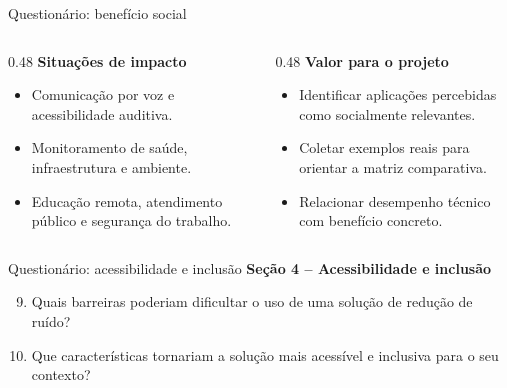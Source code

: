 \documentclass[aspectratio=1610,11pt]{beamer}
\begin{document}
{\begin{frame}[noframenumbering]{Questionário: benefício social}
    \vspace{0.2cm}
    \begin{columns}[T,onlytextwidth]
        \begin{column}{0.48\textwidth}
            \textbf{Situações de impacto}
            \begin{itemize}
                \item Comunicação por voz e acessibilidade auditiva.
                \item Monitoramento de saúde, infraestrutura e ambiente.
                \item Educação remota, atendimento público e segurança do trabalho.
            \end{itemize}
        \end{column}
        \begin{column}{0.48\textwidth}
            \textbf{Valor para o projeto}
            \begin{itemize}
                \item Identificar aplicações percebidas como socialmente relevantes.
                \item Coletar exemplos reais para orientar a matriz comparativa.
                \item Relacionar desempenho técnico com benefício concreto.
            \end{itemize}
        \end{column}
    \end{columns}
\end{frame}

\begin{frame}[noframenumbering]{Questionário: acessibilidade e inclusão}
    \footnotesize
    \textbf{Seção 4 -- Acessibilidade e inclusão}
    \begin{enumerate}
        \setcounter{enumi}{8}
        \item Quais barreiras poderiam dificultar o uso de uma solução de redução de ruído?
        \item Que características tornariam a solução mais acessível e inclusiva para o seu contexto?
    \end{enumerate}


\end{frame}}
\end{document}
